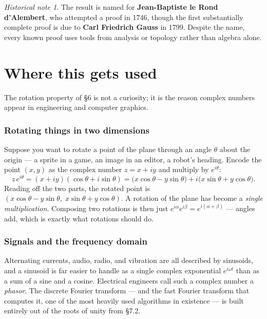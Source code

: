 \documentclass[11pt]{article}
\theoremstyle{definition}
\theoremstyle{remark}
\newtheorem*{hist}{Historical note}
\begin{document}
\begin{hist}
The result is named for \textbf{Jean-Baptiste le Rond d'Alembert}, who attempted
a proof in 1746, though the first substantially complete proof is due to
\textbf{Carl Friedrich Gauss} in 1799. Despite the name, every known proof uses
tools from analysis or topology rather than algebra alone.
\end{hist}

\section{Where this gets used}
The rotation property of \S6 is not a curiosity; it is the reason complex
numbers appear in engineering and computer graphics.

\subsubsection*{Rotating things in two dimensions}
Suppose you want to rotate a point of the plane through an angle $\theta$ about
the origin --- a sprite in a game, an image in an editor, a robot's heading.
Encode the point $(x,y)$ as the complex number $z=x+iy$ and multiply by
$e^{i\theta}$:
\[
  z\,e^{i\theta}
  = (x+iy)(\cos\theta+i\sin\theta)
  = \bigl(x\cos\theta - y\sin\theta\bigr)
    + i\bigl(x\sin\theta + y\cos\theta\bigr).
\]
Reading off the two parts, the rotated point is
$(x\cos\theta-y\sin\theta,\;x\sin\theta+y\cos\theta)$. A rotation of the plane
has become a \emph{single multiplication}. Composing two rotations is then just
$e^{i\alpha}e^{i\beta}=e^{i(\alpha+\beta)}$ --- angles add, which is exactly what
rotations should do.

\subsubsection*{Signals and the frequency domain}
Alternating currents, audio, radio, and vibration are all described by
sinusoids, and a sinusoid is far easier to handle as a single complex
exponential $e^{i\omega t}$ than as a sum of a sine and a cosine. Electrical
engineers call such a complex number a \emph{phasor}. The discrete Fourier
transform --- and the fast Fourier transform that computes it, one of the most
heavily used algorithms in existence --- is built entirely out of the roots of
unity from \S7.2.
\end{document}
